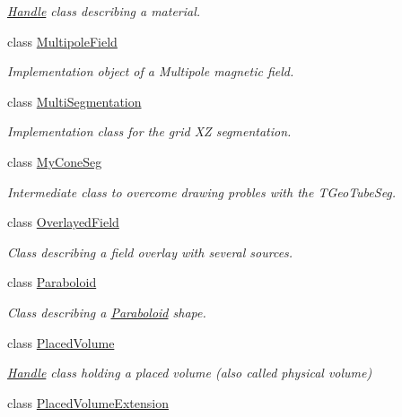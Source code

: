 \begin{DoxyCompactItemize}
\begin{DoxyCompactList}\small\item\em \hyperlink{class_d_d4hep_1_1_handle}{Handle} class describing a material. \end{DoxyCompactList}\item 
class \hyperlink{class_d_d4hep_1_1_geometry_1_1_multipole_field}{Multipole\+Field}
\begin{DoxyCompactList}\small\item\em Implementation object of a Multipole magnetic field. \end{DoxyCompactList}\item 
class \hyperlink{class_d_d4hep_1_1_geometry_1_1_multi_segmentation}{Multi\+Segmentation}
\begin{DoxyCompactList}\small\item\em Implementation class for the grid XZ segmentation. \end{DoxyCompactList}\item 
class \hyperlink{class_d_d4hep_1_1_geometry_1_1_my_cone_seg}{My\+Cone\+Seg}
\begin{DoxyCompactList}\small\item\em Intermediate class to overcome drawing probles with the T\+Geo\+Tube\+Seg. \end{DoxyCompactList}\item 
class \hyperlink{class_d_d4hep_1_1_geometry_1_1_overlayed_field}{Overlayed\+Field}
\begin{DoxyCompactList}\small\item\em Class describing a field overlay with several sources. \end{DoxyCompactList}\item 
class \hyperlink{class_d_d4hep_1_1_geometry_1_1_paraboloid}{Paraboloid}
\begin{DoxyCompactList}\small\item\em Class describing a \hyperlink{class_d_d4hep_1_1_geometry_1_1_paraboloid}{Paraboloid} shape. \end{DoxyCompactList}\item 
class \hyperlink{class_d_d4hep_1_1_geometry_1_1_placed_volume}{Placed\+Volume}
\begin{DoxyCompactList}\small\item\em \hyperlink{class_d_d4hep_1_1_handle}{Handle} class holding a placed volume (also called physical volume) \end{DoxyCompactList}\item 
class \hyperlink{class_d_d4hep_1_1_geometry_1_1_placed_volume_extension}{Placed\+Volume\+Extension}

\end{DoxyCompactItemize}
